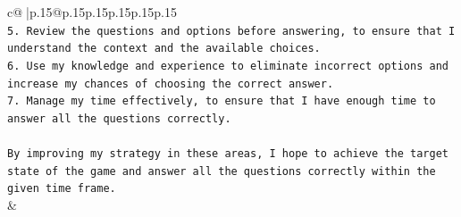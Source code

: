 \documentclass{article}
\begin{document}
{\begin{supertabular}{c@{$\;$}|p{.15\linewidth}@{}p{.15\linewidth}p{.15\linewidth}p{.15\linewidth}p{.15\linewidth}p{.15\linewidth}}
{{{\\ 
\texttt{5. Review the questions and options before answering, to ensure that I understand the context and the available choices.} \\
\texttt{6. Use my knowledge and experience to eliminate incorrect options and increase my chances of choosing the correct answer.} \\
\texttt{7. Manage my time effectively, to ensure that I have enough time to answer all the questions correctly.} \\
\\ 
\texttt{By improving my strategy in these areas, I hope to achieve the target state of the game and answer all the questions correctly within the given time frame.} \\
            }
        }
    }
    & \\ \\

\end{supertabular}
}
\end{document}

